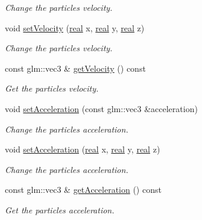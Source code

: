 \begin{DoxyCompactItemize}
\begin{DoxyCompactList}\small\item\em Change the particle\textquotesingle{}s velocity. \end{DoxyCompactList}\item 
void \mbox{\hyperlink{classr3_1_1_particle_afe7217976e22ed36892d8f7df4ea68d2}{set\+Velocity}} (\mbox{\hyperlink{namespacer3_ab2016b3e3f743fb735afce242f0dc1eb}{real}} x, \mbox{\hyperlink{namespacer3_ab2016b3e3f743fb735afce242f0dc1eb}{real}} y, \mbox{\hyperlink{namespacer3_ab2016b3e3f743fb735afce242f0dc1eb}{real}} z)
\begin{DoxyCompactList}\small\item\em Change the particle\textquotesingle{}s velocity. \end{DoxyCompactList}\item 
const glm\+::vec3 \& \mbox{\hyperlink{classr3_1_1_particle_ad62513767465d21c328b4296aa9720ff}{get\+Velocity}} () const
\begin{DoxyCompactList}\small\item\em Get the particle\textquotesingle{}s velocity. \end{DoxyCompactList}\item 
void \mbox{\hyperlink{classr3_1_1_particle_ad4c180ad74ee8cfd1b0e5c76347d6182}{set\+Acceleration}} (const glm\+::vec3 \&acceleration)
\begin{DoxyCompactList}\small\item\em Change the particle\textquotesingle{}s acceleration. \end{DoxyCompactList}\item 
void \mbox{\hyperlink{classr3_1_1_particle_a4043de464de32d14d8db0f676f63da75}{set\+Acceleration}} (\mbox{\hyperlink{namespacer3_ab2016b3e3f743fb735afce242f0dc1eb}{real}} x, \mbox{\hyperlink{namespacer3_ab2016b3e3f743fb735afce242f0dc1eb}{real}} y, \mbox{\hyperlink{namespacer3_ab2016b3e3f743fb735afce242f0dc1eb}{real}} z)
\begin{DoxyCompactList}\small\item\em Change the particle\textquotesingle{}s acceleration. \end{DoxyCompactList}\item 
const glm\+::vec3 \& \mbox{\hyperlink{classr3_1_1_particle_ab97ffa1b19d4fda5ea49b67531d0300d}{get\+Acceleration}} () const
\begin{DoxyCompactList}\small\item\em Get the particle\textquotesingle{}s acceleration. \end{DoxyCompactList}\item 

\end{DoxyCompactItemize}
